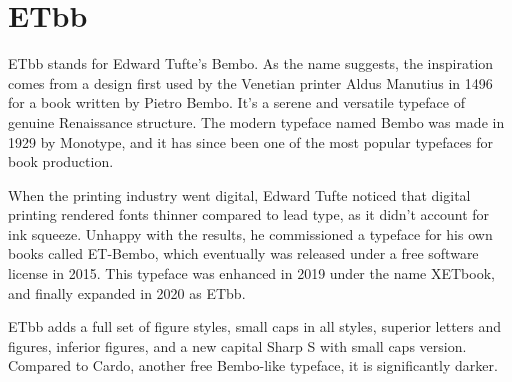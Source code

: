 \switchtobodyfont[etbb,10pt]
\chapter[etbb]{ETbb}

ETbb stands for Edward Tufte’s Bembo. As the name suggests, the inspiration comes from a design first used by the Venetian printer Aldus Manutius in 1496 for a book written by Pietro Bembo. It’s a serene and versatile typeface of genuine Renaissance structure. The modern typeface named Bembo was made in 1929 by Monotype, and it has since been one of the most popular typefaces for book production.

When the printing industry went digital, Edward Tufte noticed that digital printing rendered fonts thinner compared to lead type, as it didn’t account for ink squeeze. Unhappy with the results, he commissioned a typeface for his own books called ET-Bembo, which eventually was released under a free software license in 2015. This typeface was enhanced in 2019 under the name XETbook, and finally expanded in 2020 as ETbb.

ETbb adds a full set of figure styles, small caps in all styles, superior letters and figures, inferior figures, and a new capital Sharp S with small caps version. Compared to Cardo, another free Bembo-like typeface, it is significantly darker.


